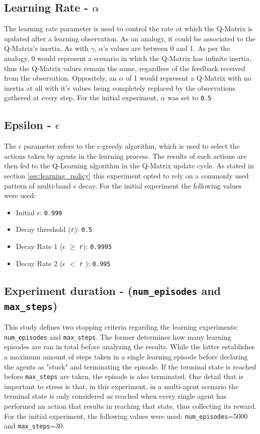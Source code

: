 \documentclass[10pt]{article}
\begin{document}
    \subsection{Learning Rate - $\alpha$}
        The learning rate parameter is used to control the rate at which the Q-Matrix is updated after a learning observation. As an analogy, it could be associated to the Q-Matrix's inertia. As with $\gamma$, $\alpha$'s values are between 0 and 1. As per the analogy, 0 would represent a scenario in which the Q-Matrix has infinite inertia, thus the Q-Matrix values remain the same, regardless of the feedback received from the observation. Oppositely, an $\alpha$ of 1 would represent a Q-Matrix with no inertia at all with it's values being completely replaced by the observations gathered at every step. For the initial experiment, $\alpha$ was set to \texttt{0.5}

    \subsection{Epsilon - $\epsilon$}
        The $\epsilon$ parameter refers to the $\epsilon$-greedy algorithm, which is used to select the actions taken by agents in the learning process. The results of such actions are then fed to the Q-Learning algorithm in the Q-Matrix update cycle. As stated in section \ref{sec:learning_policy} this experiment opted to rely on a commonly used pattern of multi-band $\epsilon$ decay. For the initial experiment the following values were used:
        \begin{itemize}
            \item Initial $\epsilon$: \texttt{0.999}
            \item Decay threshold (\texttt{r}): \texttt{0.5}
            \item Decay Rate 1 ($\epsilon$ $\geqslant$ \texttt{r}): \texttt{0.9995}
            \item Decay Rate 2 ($\epsilon$ $<$ \texttt{r} ): \texttt{0.995}
        \end{itemize}

    \subsection{Experiment duration - (\texttt{num\_episodes} and \texttt{max\_steps})}\label{sec:params:duration}
        \sloppy This study defines two stopping criteria regarding the learning experiments: \texttt{num\_episodes} and \texttt{max\_steps}. The former determines how many learning episodes are ran in total before analyzing the results. While the latter establishes a maximum amount of steps taken in a single learning episode before declaring the agents as "stuck" and terminating the episode. If the terminal state is reached before \texttt{max\_steps} are taken, the episode is also terminated. One detail that is important to stress is that, in this experiment, in a multi-agent scenario the terminal state is only considered as reached when every single agent has performed an action that results in reaching that state, thus collecting its reward. For the initial experiment, the following values were used: \texttt{num\_episodes}=5000 and \texttt{max\_steps}=30.
\end{document}
